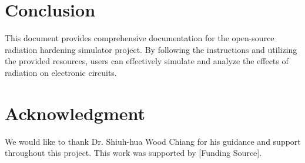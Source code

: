 \documentclass[12pt]{article}
\begin{document}
\section{Conclusion}
This document provides comprehensive documentation for the open-source radiation hardening simulator project. By following the instructions and utilizing the provided resources, users can effectively simulate and analyze the effects of radiation on electronic circuits.

\section*{Acknowledgment}
We would like to thank Dr. Shiuh-hua Wood Chiang for his guidance and support throughout this project. This work was supported by [Funding Source].
\end{document}
